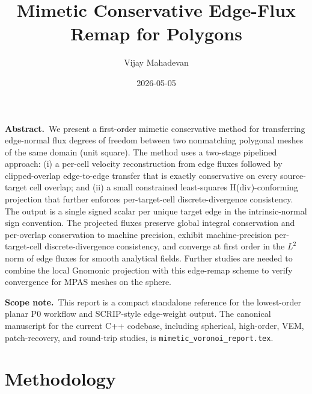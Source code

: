 \documentclass[10pt]{article}
\title{\vspace{-1.6em}Mimetic Conservative Edge-Flux Remap for Polygons}
\author{Vijay Mahadevan}
\date{\vspace{-0.6em}2026-05-05\vspace{-1em}}
\begin{document}
\maketitle

\noindent\textbf{Abstract.}\,
We present a first-order mimetic conservative method for transferring edge-normal flux degrees of freedom between two nonmatching polygonal meshes of the same domain (unit square). The method uses a two-stage pipelined approach: (i) a per-cell velocity reconstruction from edge fluxes followed by clipped-overlap edge-to-edge transfer that is exactly conservative on every source-target cell overlap; and (ii) a small constrained least-squares H(div)-conforming projection that further enforces per-target-cell discrete-divergence consistency. The output is a single signed scalar per unique target edge in the intrinsic-normal sign convention. The projected fluxes preserve global integral conservation and per-overlap conservation to machine precision, exhibit machine-precision per-target-cell discrete-divergence consistency, and converge at first order in the $L^2$ norm of edge fluxes for smooth analytical fields. Further studies are needed to combine the local Gnomonic projection with this edge-remap scheme to verify convergence for MPAS meshes on the sphere.

\smallskip
\noindent\textbf{Scope note.}\,
This report is a compact standalone reference for the lowest-order planar P0
workflow and SCRIP-style edge-weight output.  The canonical manuscript for the
current C++ codebase, including spherical, high-order, VEM, patch-recovery, and
round-trip studies, is \texttt{mimetic\_voronoi\_report.tex}.

\section{Methodology}
\end{document}
